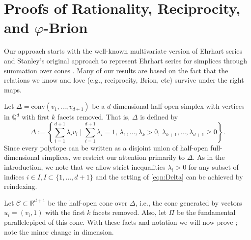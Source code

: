 \documentclass[12pt,reqno]{amsart}
\theoremstyle{definition}
\theoremstyle{remark}
\newcommand{\conv}{\mathrm{conv}}
\newcommand{\Q}{\mathbb{Q}}
\newcommand{\R}{\mathbb{R}}
\begin{document}
\section{Proofs of Rationality, Reciprocity, and $\varphi$-Brion}
\label{sec:proofsofmainthms}

Our approach starts with the well-known multivariate version of Ehrhart series and Stanley's original approach to represent Ehrhart series for simplices through summation over cones \cite{StanleyDecompositions}. Many of our results are based on the fact that
the relations we know and love (e.g., reciprocity, Brion, etc) survive under the right maps.


Let $\Delta=\conv(v_1,\ldots,v_{d+1})$ be a $d$-dimensional half-open simplex with vertices in $\Q^d$ with first $k$ facets removed. That is, $\Delta$ is defined by
\begin{equation}
\label{eqn:Delta}
\Delta:=\left\{\sum_{i=1}^{d+1} \lambda_i v_i \mid \sum_{i=1}^{d+1} \lambda_i =1, \,\lambda_1,\ldots,\lambda_k>0, \,\lambda_{k+1},\ldots,\lambda_{d+1}\geq 0\right\}.
\end{equation}
Since every polytope can be written as a disjoint union of half-open full-dimensional simplices, we restrict our attention primarily to $\Delta$. As in the introduction, we note that we allow strict inequalities $\lambda_i>0$ for any subset of indices $i\in I, I\subset \{1, \ldots,d+1\}$ and the setting of \eqref{eqn:Delta} can be achieved by reindexing.

Let $\mathcal C\subset \R^{d+1}$ be the half-open cone over $\Delta$, i.e., the cone generated by vectors $u_i=(v_i,1)$ with the first $k$ facets removed. Also, let $\Pi$ be the fundamental parallelepiped of this cone. With these facts and notation we will now prove  ; note the minor change in dimension.
\end{document}
